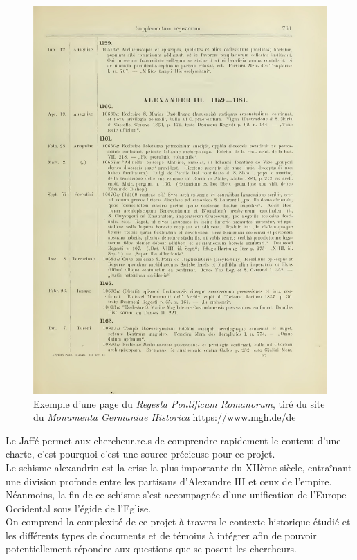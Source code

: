 \begin{figure}[H]
    \centering
    \includegraphics[width=12cm]{images/jaffe2_00772.jpg}
    \caption{Exemple d'une page du \textit{Regesta Pontificum Romanorum}, tiré du site du \textit{Monumenta Germaniae Historica} \url{https://www.mgh.de/de}}
    \label{fig:Jaffe2}
\end{figure}

Le Jaffé permet aux chercheur.re.s de comprendre rapidement le contenu d'une charte, c'est pourquoi c'est une source précieuse pour ce projet.\\

Le schisme alexandrin est la crise la plus importante du XIIème siècle, entraînant une division profonde entre les partisans d'Alexandre III et ceux de l'empire. Néanmoins, la fin de ce schisme s'est accompagnée d'une unification de l'Europe Occidental sous l'égide de l'Eglise.\\ 
On comprend la complexité de ce projet à travers le contexte historique étudié et les différents types de documents et de témoins à intégrer afin de pouvoir potentiellement répondre aux questions que se posent les chercheurs. 